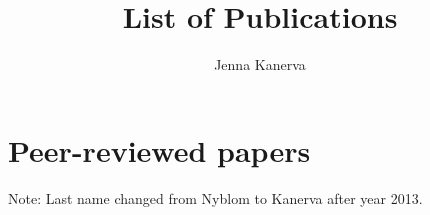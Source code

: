 \documentclass[letterpaper,11pt]{article}
\begin{document}
\title{\vspace{-1.5cm}List of Publications}
\author{Jenna Kanerva}
\date{}
\maketitle

\section{Peer-reviewed papers}
\renewcommand\refname{\vskip -1cm}
Note: Last name changed from Nyblom to Kanerva after year 2013.
\medskip
\nocite{*}


\end{document}
